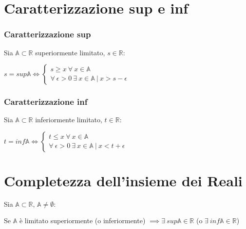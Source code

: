 \section{Caratterizzazione sup e inf}
\subsubsection{Caratterizzazione sup}
Sia $\mathbb{A} \subset \mathbb{R}$ superiormente limitato, $s \in \mathbb{R}$:\\
\begin{Large}
$s=sup\mathbb{A} \iff
\begin{cases}
s \geq x\ \forall\ x \in \mathbb{A}\\
\forall\ \epsilon > 0\ \exists\ x \in \mathbb{A}\ |\ x > s-\epsilon
\end{cases}$
\end{Large}
\subsubsection{Caratterizzazione inf}
Sia $\mathbb{A} \subset \mathbb{R}$ inferiormente limitato, $t \in \mathbb{R}$:\\
\begin{Large}
$t=inf\mathbb{A} \iff
\begin{cases}
t \leq x\ \forall\ x \in \mathbb{A}\\
\forall\ \epsilon > 0\ \exists\ x \in \mathbb{A}\ |\ x < t+\epsilon
\end{cases}$
\end{Large}

\label{sec: CompletezzaReali}
\section{Completezza dell'insieme dei Reali}
Sia $\mathbb{A} \subset \mathbb{R}$, $\mathbb{A} \neq \emptyset$:\\
\begin{Large}
Se $\mathbb{A}$ è limitato superiormente (o inferiormente) $\implies \exists\ sup\mathbb{A} \in \mathbb{R}$ (o $\exists\ inf\mathbb{A} \in \mathbb{R}$)
\end{Large}
